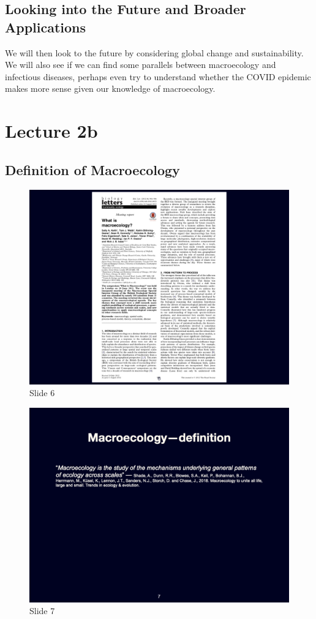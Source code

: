 \documentclass[
  10pt,
]{book}
\begin{document}
\section{Looking into the Future and Broader
Applications}\label{looking-into-the-future-and-broader-applications}

We will then look to the future by considering global change and
sustainability. We will also see if we can find some parallels between
macroecology and infectious diseases, perhaps even try to understand
whether the COVID epidemic makes more sense given our knowledge of
macroecology.

\chapter*{Lecture 2b}\label{lecture-2b}

\section{Definition of Macroecology}\label{definition-of-macroecology}

\begin{figure}[ht]
\centering
\includegraphics[width=0.8\linewidth]{../images/BDC334/BDC334-006.jpeg}
\caption*{Slide 6}
\end{figure}

\begin{figure}[ht]
\centering
\includegraphics[width=0.8\linewidth]{../images/BDC334/BDC334-007.jpeg}
\caption*{Slide 7}
\end{figure}
\end{document}
